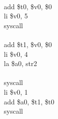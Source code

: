 \documentclass[../main.tex]{subfiles}
\begin{document}
{    \\
    \hspace*{0cm} \hspace*{0cm} \hspace*{0cm} \hspace*{0cm} add \$t0, \$v0, \$0 \\
    \hspace*{0cm} \hspace*{0cm} \hspace*{0cm} \hspace*{0cm} li \$v0, 5 \\
    \hspace*{0cm} \hspace*{0cm} \hspace*{0cm} \hspace*{0cm} syscall \\
    \\
    \hspace*{0cm} \hspace*{0cm} \hspace*{0cm} \hspace*{0cm} add \$t1, \$v0, \$0 \\
    \hspace*{0cm} \hspace*{0cm} \hspace*{0cm} \hspace*{0cm} li \$v0, 4 \\
    \hspace*{0cm} \hspace*{0cm} \hspace*{0cm} \hspace*{0cm} la \$a0, str2 \\
    \\
    \hspace*{0cm} \hspace*{0cm} \hspace*{0cm} \hspace*{0cm} syscall \\
    \hspace*{0cm} \hspace*{0cm} \hspace*{0cm} \hspace*{0cm} li \$v0, 1 \\
    \hspace*{0cm} \hspace*{0cm} \hspace*{0cm} \hspace*{0cm} add \$a0, \$t1, \$t0 \\
    \hspace*{0cm} \hspace*{0cm} \hspace*{0cm} \hspace*{0cm} syscall \\
}
\end{document}
